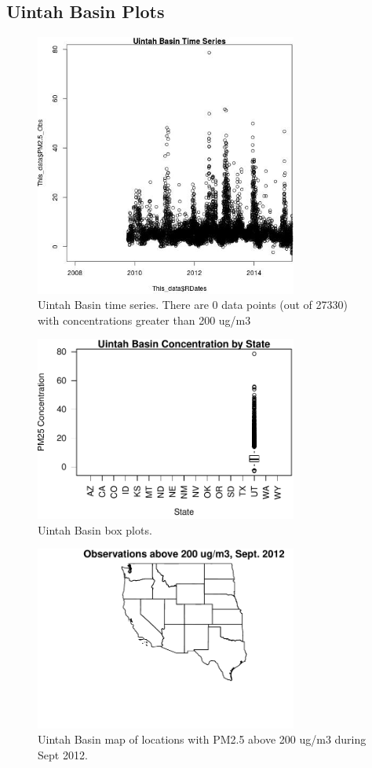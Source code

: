 \subsection{Uintah Basin Plots}
\begin{figure} 
\centering 
\includegraphics[width=0.77\textwidth]{Code_Outputs/UintahBasin_time_series.jpg} 
\caption{\label{fig:UintahBasinTS}Uintah Basin time series. There are 0 data points (out of 27330) with concentrations greater than 200 ug/m3} 
\end{figure} 
 

\begin{figure} 
\centering 
\includegraphics[width=0.77\textwidth]{Code_Outputs/UintahBasin_state_boxplots.pdf} 
\caption{\label{fig:UintahBasinBP}Uintah Basin box plots.} 
\end{figure} 
 

\begin{figure} 
\centering 
\includegraphics[width=0.77\textwidth]{Code_Outputs/UintahBasinSep2012High_map.pdf} 
\caption{\label{fig:UintahBasinS12}Uintah Basin map of locations with PM2.5 above 200 ug/m3 during Sept 2012.} 
\end{figure} 
 
